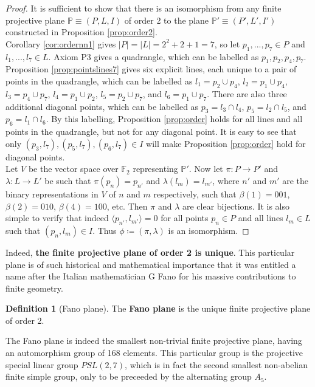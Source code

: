 \documentclass{report}
\newcommand{\F}{\mathbb{F}}
\renewcommand{\P}{\mathbb{P}}
\theoremstyle{definition}\newtheorem*{definition}{Definition}
\theoremstyle{definition}\newtheorem*{example}{Example}
\theoremstyle{remark}\newtheorem*{remark}{Remark}
\begin{document}
\begin{proof}
It is sufficient to show that there is an isomorphism from any finite projective plane $ \P \equiv (P, L, I) $ of order 2 to the plane $ \P' \equiv (P', L', I') $ constructed in Proposition \ref{prop:order2}. \\
Corollary \ref{cor:ordernn1} gives $ |P| = |L| = 2^2 + 2 + 1 = 7 $, so let $ p_1, ..., p_7 \in P $ and $ l_1, ..., l_7 \in L $. Axiom P3 gives a quadrangle, which can be labelled as $ p_1, p_2, p_4, p_7 $. Proposition \ref{prop:pointslines7} gives six explicit lines, each unique to a pair of points in the quadrangle, which can be labelled as $ l_1 = p_2 \cup p_4 $, $ l_2 = p_1 \cup p_4 $, $ l_3 = p_4 \cup p_7 $, $ l_4 = p_1 \cup p_2 $, $ l_5 = p_2 \cup p_7 $, and $ l_6 = p_1 \cup p_7 $. There are also three additional diagonal points, which can be labelled as $ p_3 = l_3 \cap l_4 $, $ p_5 = l_2 \cap l_5 $, and $ p_6 = l_1 \cap l_6 $. By this labelling, Proposition \ref{prop:order} holds for all lines and all points in the quadrangle, but not for any diagonal point. It is easy to see that only $ (p_3, l_7), (p_5, l_7), (p_6, l_7) \in I $ will make Proposition \ref{prop:order} hold for diagonal points. \\
Let $ V $ be the vector space over $ \F_2 $ representing $ \P' $. Now let $ \pi : P \to P' $ and $ \lambda : L \to L' $ be such that $ \pi(p_n) = p_{n'} $ and $ \lambda(l_m) = l_{m'} $, where $ n' $ and $ m' $ are the binary representations in $ V $ of $ n $ and $ m $ respectively, such that $ \beta(1) = 001 $, $ \beta(2) = 010 $, $ \beta(4) = 100 $, etc. Then $ \pi $ and $ \lambda $ are clear bijections. It is also simple to verify that indeed $ \langle p_{n'}, l_{m'} \rangle = 0 $ for all points $ p_n \in P $ and all lines $ l_m \in L $ such that $ (p_n, l_m) \in I $. Thus $ \phi \coloneqq (\pi, \lambda) $ is an isomorphism.
\end{proof}

Indeed, \textbf{the finite projective plane of order 2 is unique}. This particular plane is of such historical and mathematical importance that it was entitled a name after the Italian mathematician G Fano for his massive contributions to finite geometry.

\begin{definition}[Fano plane]
The \textbf{Fano plane} is the unique finite projective plane of order 2.
\end{definition}

The Fano plane is indeed the smallest non-trivial finite projective plane, having an automorphism group of 168 elements. This particular group is the projective special linear group $ PSL(2, 7) $, which is in fact the second smallest non-abelian finite simple group, only to be preceeded by the alternating group $ A_5 $.
\end{document}
